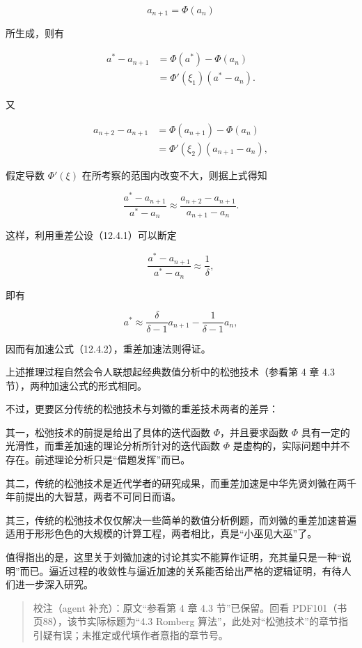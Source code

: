 \[
a_{n+1}=\Phi(a_n)
\]

所生成，则有

\[
\begin{aligned}
a^*-a_{n+1}&=\Phi(a^*)-\Phi(a_n)\\
&=\Phi'(\xi_1)(a^*-a_n).
\end{aligned}
\]

又

\[
\begin{aligned}
a_{n+2}-a_{n+1}&=\Phi(a_{n+1})-\Phi(a_n)\\
&=\Phi'(\xi_2)(a_{n+1}-a_n),
\end{aligned}
\]

假定导数 \(\Phi'(\xi)\) 在所考察的范围内改变不大，则据上式得知

\[
\frac{a^*-a_{n+1}}{a^*-a_n}\approx\frac{a_{n+2}-a_{n+1}}{a_{n+1}-a_n}.
\]

这样，利用重差公设（12.4.1）可以断定

\[
\frac{a^*-a_{n+1}}{a^*-a_n}\approx\frac1\delta,
\]

即有

\[
a^*\approx\frac{\delta}{\delta-1}a_{n+1}-\frac1{\delta-1}a_n,
\]

因而有加速公式（12.4.2），重差加速法则得证。

上述推理过程自然会令人联想起经典数值分析中的松弛技术（参看第 4 章 4.3 节），两种加速公式的形式相同。

不过，更要区分传统的松弛技术与刘徽的重差技术两者的差异：

其一，松弛技术的前提是给出了具体的迭代函数 \(\Phi\)，并且要求函数 \(\Phi\) 具有一定的光滑性，而重差加速的理论分析所针对的迭代函数 \(\Phi\) 是虚构的，实际问题中并不存在。前述理论分析只是``借题发挥''而已。

其二，传统的松弛技术是近代学者的研究成果，而重差加速是中华先贤刘徽在两千年前提出的大智慧，两者不可同日而语。

其三，传统的松弛技术仅仅解决一些简单的数值分析例题，而刘徽的重差加速普遍适用于形形色色的大规模的计算工程，两者相比，真是``小巫见大巫''了。

值得指出的是，这里关于刘徽加速的讨论其实不能算作证明，充其量只是一种``说明''而已。逼近过程的收敛性与逼近加速的关系能否给出严格的逻辑证明，有待人们进一步深入研究。

\begin{quote}
校注（agent 补充）：原文``参看第 4 章 4.3 节''已保留。回看 PDF101（书页88），该节实际标题为``4.3 Romberg 算法''，此处对``松弛技术''的章节指引疑有误；未推定或代填作者意指的章节号。
\end{quote}

